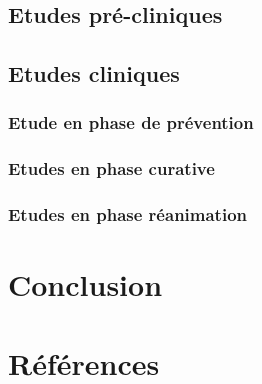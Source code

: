 \documentclass[
  letterpaper,
  DIV=11,
  numbers=noendperiod]{scrartcl}
\begin{document}
\hypertarget{etudes-pruxe9-cliniques}{%
\subsection{Etudes pré-cliniques}\label{etudes-pruxe9-cliniques}}

\hypertarget{etudes-cliniques}{%
\subsection{Etudes cliniques}\label{etudes-cliniques}}

\hypertarget{etude-en-phase-de-pruxe9vention}{%
\subsubsection{Etude en phase de
prévention}\label{etude-en-phase-de-pruxe9vention}}

\hypertarget{etudes-en-phase-curative}{%
\subsubsection{Etudes en phase
curative}\label{etudes-en-phase-curative}}

\hypertarget{etudes-en-phase-ruxe9animation}{%
\subsubsection{Etudes en phase
réanimation}\label{etudes-en-phase-ruxe9animation}}

\newpage{}

\hypertarget{conclusion}{%
\section{Conclusion}\label{conclusion}}

\newpage{}

\hypertarget{ruxe9fuxe9rences}{%
\section*{Références}\label{ruxe9fuxe9rences}}
\end{document}
